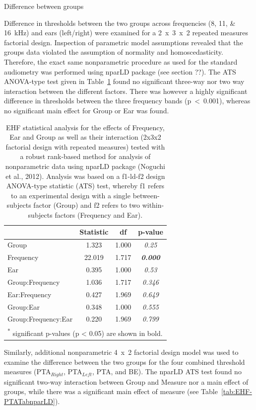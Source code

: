 \documentclass[a4paper, twoside]{templates/ociamthesis}
\begin{document}
\colorbox[HTML]{CCCCFF}{Difference between groups}

Difference in thresholds between the two groups across frequencies (8, 11, \& 16~kHz) and ears (left/right) were examined for a 2~x~3~x~2 repeated measures factorial design. Inspection of parametric model assumptions revealed that the groups data violated the assumption of normality and homoscedasticity. Therefore, the exact same nonparametric procedure as used for the standard audiometry was performed using nparLD package (see section ??). The ATS ANOVA-type test given in Table~\ref{tab:EHF-TabnparLD} found no significant three-way nor two way interaction between the different factors. There was however a highly significant difference in thresholds between the three frequency bands (p~\textless~0.001), whereas no significant main effect for Group or Ear was found.

\begin{table}

\caption{\label{tab:EHF-TabnparLD}EHF statistical analysis for the effects of Frequency, Ear and Group as well as their interaction (2x3x2 factorial design with repeated measures) tested with a robust rank-based method for analysis of nonparametric data using nparLD package (Noguchi et al., 2012). Analysis was based on a f1-ld-f2 design ANOVA-type statistic (ATS) test, whereby f1 refers to an experimental design with a single between-subjects factor (Group) and f2 refers to two within-subjects factors (Frequency and Ear).}
\centering
\begin{tabular}[t]{lcc>{}c}
\toprule
  & Statistic & df & p-value\\
\midrule
Group & 1.323 & 1.000 & \em{0.25}\\
Frequency & 22.019 & 1.717 & \em{\textbf{0.000}}\\
Ear & 0.395 & 1.000 & \em{0.53}\\
Group:Frequency & 1.036 & 1.717 & \em{0.346}\\
Ear:Frequency & 0.427 & 1.969 & \em{0.649}\\
Group:Ear & 0.348 & 1.000 & \em{0.555}\\
Group:Frequency:Ear & 0.220 & 1.969 & \em{0.799}\\
\bottomrule
\multicolumn{4}{l}{\textsuperscript{*} significant p-values (p < 0.05) are shown in bold.}\\
\end{tabular}
\end{table}

Similarly, additional nonparametric 4~x~2 factorial design model was used to examine the difference between the two groups for the four combined threshold measures (PTA\(_{Right}\), PTA\(_{Left}\), PTA, and BE). The nparLD ATS test found no significant two-way interaction between Group and Measure nor a main effect of groups, while there was a significant main effect of measure (see Table~\ref{tab:EHF-PTATabnparLD}).
\end{document}

